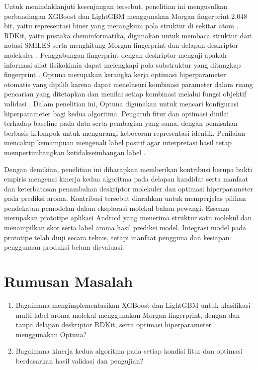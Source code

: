 Untuk menindaklanjuti kesenjangan tersebut, penelitian ini mengusulkan perbandingan XGBoost dan LightGBM menggunakan Morgan fingerprint 2.048 bit, yaitu representasi biner yang merangkum pola struktur di sekitar atom \cite{rogers2010}. RDKit, yaitu pustaka cheminformatika, digunakan untuk membaca struktur dari notasi SMILES serta menghitung Morgan fingerprint dan delapan deskriptor molekuler \cite{rdkitgenerator2026,rdkitdescriptors2026}. Penggabungan fingerprint dengan deskriptor menguji apakah informasi sifat fisikokimia dapat melengkapi pola substruktur yang ditangkap fingerprint \cite{suh2025,tyagi2024}. Optuna merupakan kerangka kerja optimasi hiperparameter otomatis yang dipilih karena dapat menelusuri kombinasi parameter dalam ruang pencarian yang ditetapkan dan menilai setiap kombinasi melalui fungsi objektif validasi \cite{akiba2019}. Dalam penelitian ini, Optuna digunakan untuk mencari konfigurasi hiperparameter bagi kedua algoritma. Pengaruh fitur dan optimasi dinilai terhadap baseline pada data serta pembagian yang sama, dengan pemisahan berbasis kelompok untuk mengurangi kebocoran representasi identik. Penilaian mencakup kemampuan mengenali label positif agar interpretasi hasil tetap mempertimbangkan ketidakseimbangan label \cite{saito2015}.

Dengan demikian, penelitian ini diharapkan memberikan kontribusi berupa bukti empiris mengenai kinerja kedua algoritma pada delapan kandidat serta manfaat dan keterbatasan penambahan deskriptor molekuler dan optimasi hiperparameter pada prediksi aroma. Kontribusi tersebut diarahkan untuk memperjelas pilihan pendekatan pemodelan dalam eksplorasi molekul bahan pewangi. Essenza merupakan prototipe aplikasi Android yang menerima struktur satu molekul dan menampilkan skor serta label aroma hasil prediksi model. Integrasi model pada prototipe telah diuji secara teknis, tetapi manfaat pengguna dan kesiapan penggunaan produksi belum dievaluasi.

\section{Rumusan Masalah}

\begin{enumerate}
    \item Bagaimana mengimplementasikan XGBoost dan LightGBM untuk klasifikasi multi-label aroma molekul menggunakan Morgan fingerprint, dengan dan tanpa delapan deskriptor RDKit, serta optimasi hiperparameter menggunakan Optuna?
    \item Bagaimana kinerja kedua algoritma pada setiap kondisi fitur dan optimasi berdasarkan hasil validasi dan pengujian?
\end{enumerate}

